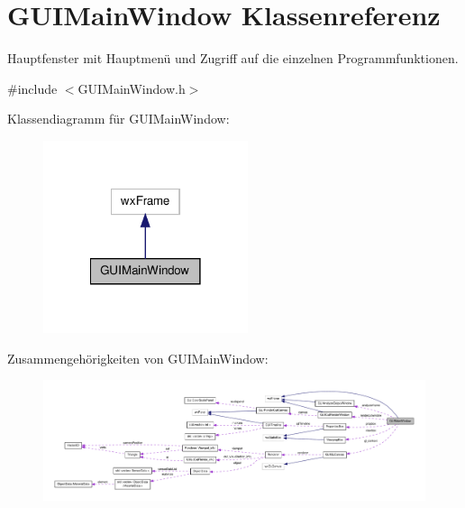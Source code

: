 \hypertarget{classGUIMainWindow}{\section{G\-U\-I\-Main\-Window Klassenreferenz}
\label{classGUIMainWindow}
}


Hauptfenster mit Hauptmenü und Zugriff auf die einzelnen Programmfunktionen.  




{\ttfamily \#include $<$G\-U\-I\-Main\-Window.\-h$>$}



Klassendiagramm für G\-U\-I\-Main\-Window\-:\nopagebreak
\begin{figure}[H]
\begin{center}
\leavevmode
\includegraphics[width=170pt]{classGUIMainWindow__inherit__graph}
\end{center}
\end{figure}


Zusammengehörigkeiten von G\-U\-I\-Main\-Window\-:\nopagebreak
\begin{figure}[H]
\begin{center}
\leavevmode
\includegraphics[width=350pt]{classGUIMainWindow__coll__graph}
\end{center}
\end{figure}
